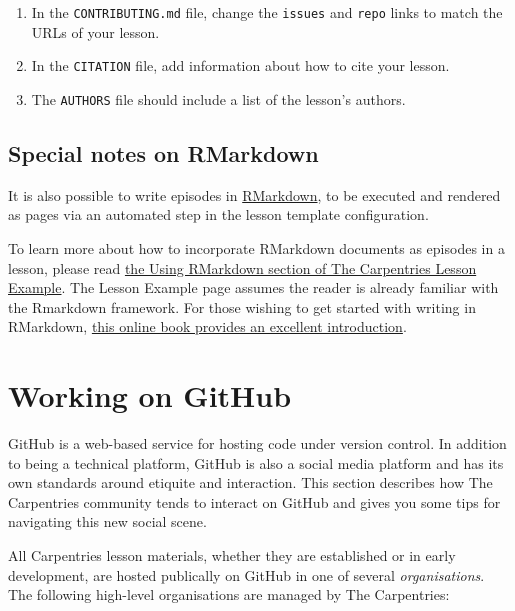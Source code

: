 \documentclass[
]{book}
\begin{document}
\begin{enumerate}
\def\labelenumi{\arabic{enumi}.}
\item
  In the \texttt{CONTRIBUTING.md} file, change the \texttt{issues} and \texttt{repo} links to match the URLs of your lesson.
\item
  In the \texttt{CITATION} file, add information about how to cite your lesson.
\item
  The \texttt{AUTHORS} file should include a list of the lesson's authors.
\end{enumerate}

\hypertarget{special-notes-on-rmarkdown}{%
\subsection{Special notes on RMarkdown}\label{special-notes-on-rmarkdown}}

It is also possible to write episodes in \href{https://rmarkdown.rstudio.com/index.html}{RMarkdown},
to be executed and rendered as pages via
an automated step in the lesson template configuration.

To learn more about how to incorporate RMarkdown documents as episodes in a lesson,
please read \href{https://carpentries.github.io/lesson-example/05-rmarkdown-example/index.html}{the Using RMarkdown section of The Carpentries Lesson Example}.
The Lesson Example page assumes the reader is already familiar with
the Rmarkdown framework.
For those wishing to get started with writing in RMarkdown,
\href{https://bookdown.org/yihui/rmarkdown/}{this online book provides an excellent introduction}.

\hypertarget{working-on-github}{%
\section{Working on GitHub}\label{working-on-github}}

GitHub is a web-based service for hosting code under version control. In addition to being a technical
platform, GitHub is also a social media platform and has its own standards around etiquite and interaction. This
section describes how The Carpentries community tends to interact on GitHub and gives you some tips for
navigating this new social scene.

All Carpentries lesson materials, whether they are established or in early development, are hosted publically
on GitHub in one of several \emph{organisations}. The following high-level organisations are managed by The Carpentries:
\end{document}
